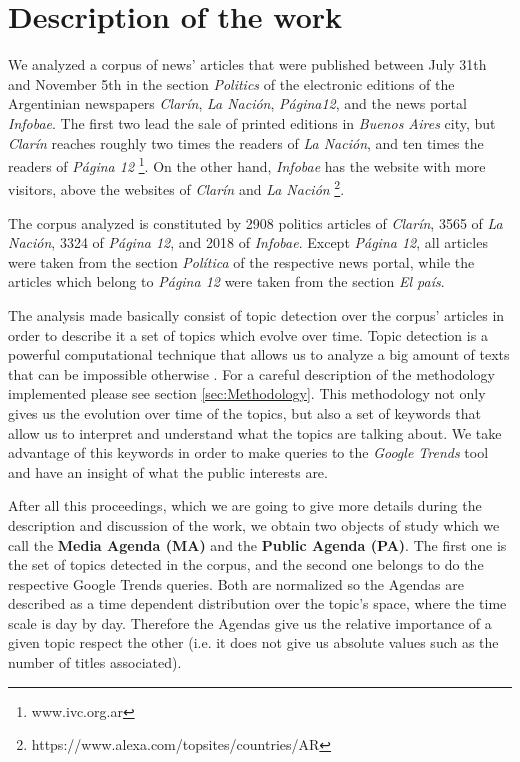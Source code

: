
\section{Description of the work}
\label{sec:description}

\par We analyzed a corpus of news' articles that were published between July 31th and November 5th in the section \emph{Politics} of the electronic editions of the Argentinian newspapers \emph{Clarín}, \emph{La Nación}, \emph{Página12}, and the news portal \emph{Infobae}.
The first two lead the sale of printed editions in \emph{Buenos Aires} city, but \emph{Clarín} reaches roughly two times the readers of \emph{La Nación}, and ten times the readers of \emph{Página 12} \footnote{www.ivc.org.ar}. On the other hand, \emph{Infobae} has the website with more visitors, above the websites of \emph{Clarín} and \emph{La Nación} \footnote{https://www.alexa.com/topsites/countries/AR}.

\par The corpus analyzed is constituted by 2908 politics articles of \emph{Clarín}, 3565 of \emph{La Nación}, 3324 of \emph{Página 12}, and 2018 of \emph{Infobae}. Except \emph{Página 12}, all articles were taken from the section \emph{Política} of the respective news portal, while the articles which belong to \emph{Página 12} were taken from the section \emph{El país}.

\par The analysis made basically consist of topic detection over the corpus' articles in order to describe it a set of topics which evolve over time. Topic detection is a powerful computational technique that allows us to analyze a big amount of texts that can be impossible otherwise \cite{griffiths2004finding}. For a careful description of the methodology implemented please see section \ref{sec:Methodology}. 
This methodology not only gives us the evolution over time of the topics, but also a set of keywords that allow us to interpret and understand what the topics are talking about. 
We take advantage of this keywords in order to make queries to the \emph{Google Trends} tool and have an insight of what the public interests are. 
\par After all this proceedings, which we are going to give more details during the description and discussion of the work, we obtain two objects of study which we call the \textbf{Media Agenda (MA)} and the \textbf{Public Agenda (PA)}. 
The first one is the set of topics detected in the corpus, and the second one belongs to do the respective Google Trends queries. 
Both are normalized so the Agendas are described as a time dependent distribution over the topic's space, where the time scale is day by day.
Therefore the Agendas give us the relative importance of a given topic respect the other (i.e. it does not give us absolute values such as the number of titles associated).


